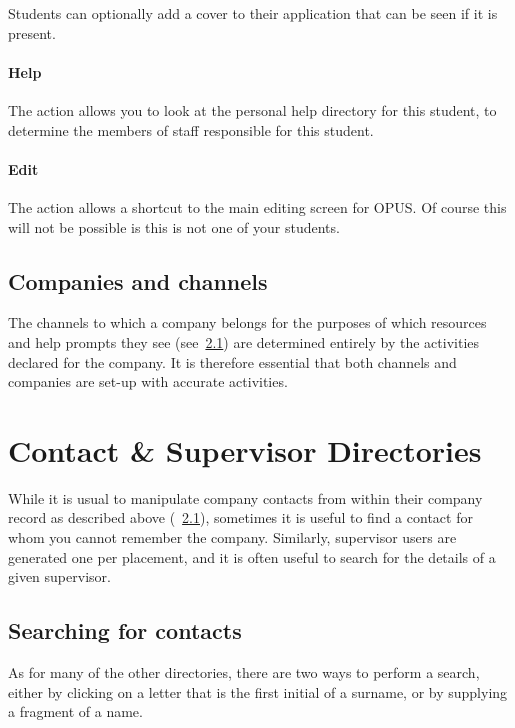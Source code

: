 \documentclass[12 pt]{book}
\begin{document}
Students can optionally add a cover  to their application that
can be seen if it is present.

\subsubsection{Help}

The  action allows you to look at the personal help directory
for this student, to determine the members of staff responsible for this
student.

\subsubsection{Edit}

The  action allows a shortcut to the main editing screen for
OPUS. Of course this will not be possible is this is not one of your students.

\section{Companies and channels}

The channels to which a company belongs for the purposes of which resources
and help prompts they see (see~\ref{}) are determined entirely by the
activities declared for the company. It is therefore essential that both
channels and companies are set-up with accurate activities.

%
%
%

\chapter{Contact \& Supervisor Directories}

While it is usual to manipulate company contacts from within their company record as described above
(~\ref{}), sometimes it is useful to find a contact for whom you cannot remember the company.
Similarly, supervisor users are generated one per placement, and it is often useful to search for
the details of a given supervisor.

\section{Searching for contacts}

As for many of the other directories, there are two ways to perform a search, either by clicking on
a letter that is the first initial of a surname, or by supplying a fragment of a name.
\end{document}
